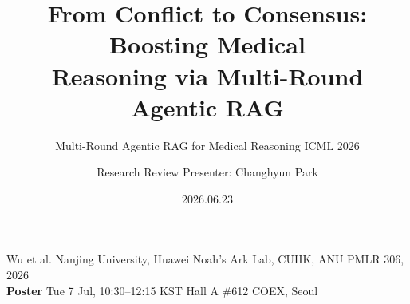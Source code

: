 \documentclass[10pt, aspectratio=169, t]{beamer}   %
\title[MA-RAG]{From Conflict to Consensus: Boosting Medical\\ Reasoning via Multi-Round Agentic RAG}
\subtitle{Multi-Round Agentic RAG for Medical Reasoning \textperiodcentered{} ICML 2026}
\author[Research Review]{Research Review \quad\textbar\quad Presenter: Changhyun Park}
\date{2026.06.23}
\newcommand{\figcap}[1]{{\color{muted}\scriptsize #1}}
\begin{document}
\begin{frame}
  \titlepage
  \begin{center}
    \figcap{Wu et al. \textperiodcentered{} Nanjing University, Huawei Noah's Ark Lab, CUHK, ANU \textperiodcentered{} PMLR 306, 2026}\\[5pt]
    {\color{accent}\scriptsize \textbf{Poster} \textperiodcentered{} Tue 7 Jul, 10:30--12:15 KST \textperiodcentered{} Hall A \#612 \textperiodcentered{} COEX, Seoul}
  \end{center}
\end{frame}

\end{document}
